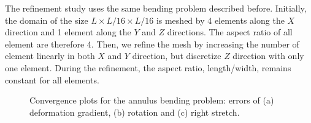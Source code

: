 \documentclass[12pt]{article}
\begin{document}
The refinement study uses the same bending problem described before. Initially, the domain of the size $L \times L/16 \times L/16$ is meshed by 4 elements along the $X$ direction and 1 element along the $Y$ and $Z$ directions. The aspect ratio of all element are therefore 4. Then, we refine the mesh by increasing the number of element linearly in both $X$ and $Y$ direction, but discretize $Z$ direction with only one element.   During the refinement, the aspect ratio, length/width, remains constant for all elements. 
\begin{figure}[htbp]
  \begin{center}
    \unitlength=1.0mm
    \caption{Convergence plots for the annulus bending problem: errors of (a) deformation gradient, (b) rotation and (c) right stretch.}
    \label{fig:RingRefinement}
  \end{center}
\end{figure}
\end{document}
